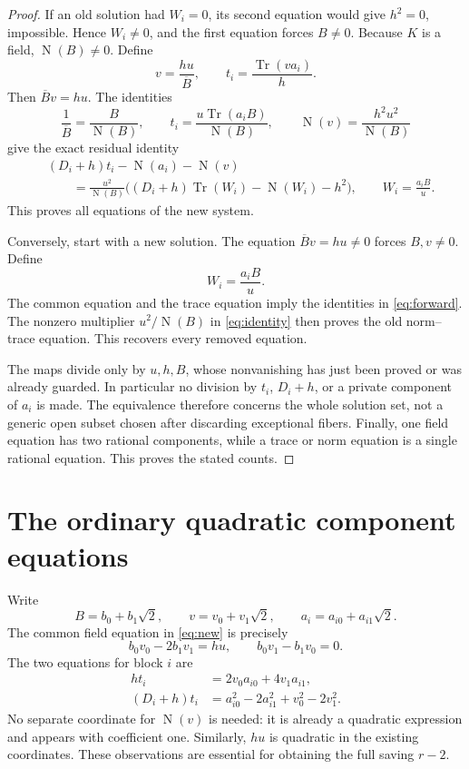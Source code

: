 \documentclass[11pt]{article}
\newcommand{\Tr}{\operatorname{Tr}}
\newcommand{\Nm}{\operatorname{N}}
\begin{document}
\begin{proof}
If an old solution had \(W_i=0\), its second equation would give
\(h^2=0\), impossible. Hence \(W_i\ne0\), and the first equation
forces \(B\ne0\). Because \(K\) is a field, \(\Nm(B)\ne0\).
Define
\begin{equation}\label{eq:forward}
             v=\frac{hu}{\overline B},\qquad
             t_i=\frac{\Tr(v a_i)}{h}.
\end{equation}
Then \(\overline Bv=hu\). The identities
\[
 \frac1{\overline B}=\frac{B}{\Nm(B)},\qquad
 t_i=\frac{u\Tr(a_iB)}{\Nm(B)},\qquad
 \Nm(v)=\frac{h^2u^2}{\Nm(B)}
\]
give the exact residual identity
\begin{align}\label{eq:identity}
 &(D_i+h)t_i-\Nm(a_i)-\Nm(v)\nonumber\\
 &\qquad=\frac{u^2}{\Nm(B)}
 \bigl((D_i+h)\Tr(W_i)-\Nm(W_i)-h^2\bigr),
 \qquad W_i=\frac{a_iB}{u}.
\end{align}
This proves all equations of the new system.

Conversely, start with a new solution. The equation
\(\overline Bv=hu\ne0\) forces \(B,v\ne0\). Define
\[
                            W_i=\frac{a_iB}{u}.
\]
The common equation and the trace equation imply the identities
in \eqref{eq:forward}. The nonzero multiplier
\(u^2/\Nm(B)\) in \eqref{eq:identity} then proves the old
norm--trace equation. This recovers every removed equation.

The maps divide only by \(u,h,B\), whose nonvanishing has just
been proved or was already guarded. In particular no division by
\(t_i\), \(D_i+h\), or a private component of \(a_i\) is made.
The equivalence therefore concerns the whole solution set, not a
generic open subset chosen after discarding exceptional fibers.
Finally, one field equation has two rational components, while a
trace or norm equation is a single rational equation. This proves
the stated counts.
\end{proof}

\section{The ordinary quadratic component equations}

Write
\[
 B=b_0+b_1\sqrt2,\qquad v=v_0+v_1\sqrt2,
 \qquad a_i=a_{i0}+a_{i1}\sqrt2.
\]
The common field equation in \eqref{eq:new} is precisely
\begin{equation}\label{eq:components-common}
                  b_0v_0-2b_1v_1=hu,\qquad
                  b_0v_1-b_1v_0=0.
\end{equation}
The two equations for block \(i\) are
\begin{equation}\label{eq:components-private}
\begin{aligned}
 h t_i&=2v_0a_{i0}+4v_1a_{i1},\\
 (D_i+h)t_i&=a_{i0}^2-2a_{i1}^2+v_0^2-2v_1^2.
\end{aligned}
\end{equation}
No separate coordinate for \(\Nm(v)\) is needed: it is already
a quadratic expression and appears with coefficient one. Similarly,
\(hu\) is quadratic in the existing coordinates. These observations
are essential for obtaining the full saving \(r-2\).
\end{document}
